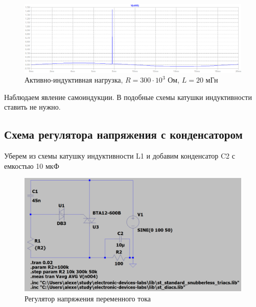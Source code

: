 \documentclass[a4paper, 12pt]{article}
\begin{document}
    \begin{figure}[H]
        \centering
        \includegraphics[scale=0.45]{R2-300k_L20m.png}
        \captionsetup{skip=0pt}
        \caption{Активно-индуктивная нагрузка, $R=300\cdot10^3$ Ом, $L=20$ мГн}
        \label{fig:R2-300k_L20m}
    \end{figure}
    \noindent Наблюдаем явление самоиндукции. В подобные схемы катушки индуктивности ставить не нужно.


    \subsection{Схема регулятора напряжения с конденсатором}
    Уберем из схемы катушку индуктивности L1 и добавим конденсатор C2 с емкостью 10 мкФ
    \begin{figure}[H]
        \centering
        \includegraphics[scale=0.3]{scheme6.png}
        \captionsetup{skip=0pt}
        \caption{Регулятор напряжения переменного тока}
        \label{fig:scheme6}
    \end{figure}
\end{document}
